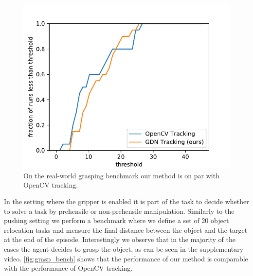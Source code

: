 \begin{figure}
\vspace{-0.3in}
\centering
\includegraphics[width=0.35\columnwidth]{images/grasping_score_cdf.pdf}
\caption{\small{On the real-world grasping benchmark our method is on par with OpenCV tracking.}}
\label{fig:grasp_bench}
\vspace{-0.3in}
\end{figure}


In the setting where the gripper is enabled it is part of the task to decide whether to solve a task by prehensile or non-prehensile manipulation. Similarly to the pushing setting we perform a benchmark where we define a set of 20 object relocation tasks and measure the final distance between the object and the target at the end of the episode. Interestingly we observe that in the majority of the cases the agent decides to grasp the object, as can be seen in the supplementary video. \autoref{fig:grasp_bench} shows that the performance of our method is comparable with the performance of OpenCV tracking.


